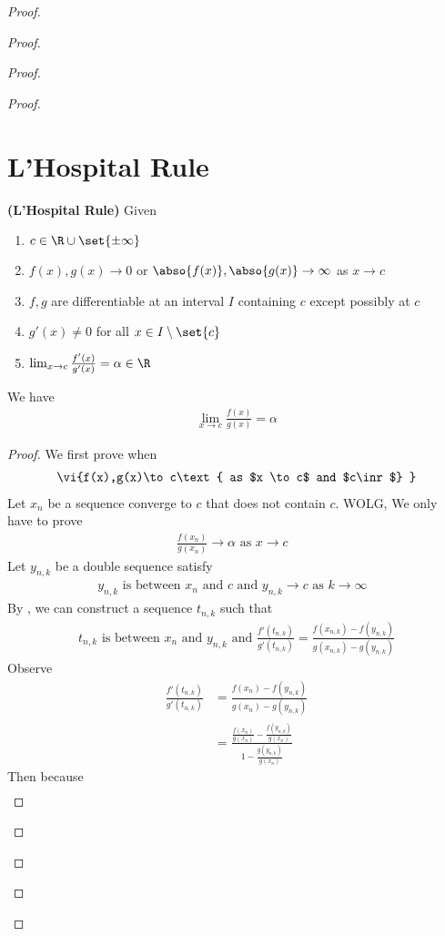\documentclass{report}
\begin{document}
\begin{proof}
\begin{proof}
\begin{proof}
\begin{proof}
\section{L'Hospital Rule}
\begin{theorem}
\label{6.4.1}
\textbf{(L'Hospital Rule)} Given 
\begin{enumerate}[label=(\alph*)]
  \item  $c\in \R\cup  \set{\pm \infty}$ 
  \item $f(x),g(x) \to 0$ or $\abso{f(x)},\abso{g(x)}\to \infty$ as $x \to c$
  \item $f,g$ are differentiable at an interval  $I$ containing  $c$  except possibly at $c$ 
  \item $g'(x)\neq 0$ for all $x\in I \setminus \set{c}$ 
  \item $\lim_{x \to c}\frac{f'(x)}{g'(x)}=\alpha \in\R$
\end{enumerate}
We have 
\begin{align*}
\lim_{x \to c} \frac{f(x)}{g(x)}=\alpha 
\end{align*}
\end{theorem}
\begin{proof}
We first prove when 
 \begin{align*}
 \vi{f(x),g(x)\to c\text{ as $x \to c$ and $c\inr$} }
 \end{align*}
Let $x_n$ be a sequence converge to $c$ that does not contain $c$. WOLG, We only have to prove 
\begin{align*}
\frac{f(x_n)}{g(x_n)}\to \alpha \text{ as $x \to c$ }
\end{align*}
Let $y_{n,k}$ be a double sequence satisfy 
\begin{align*}
y_{n,k} \text{ is between }x_n\text{ and }c\text{ and }y_{n,k}\to c\text{ as $k\to \infty$ }
\end{align*}
By , we can construct a sequence $t_{n,k}$ such that 
 \begin{align*}
t_{n,k} \text{ is between $x_n$ and  $y_{n,k}$ and }\frac{f'(t_{n,k})}{g'(t_{n,k})}=\frac{f(x_{n,k})-f(y_{n,k})}{g(x_{n,k})-g(y_{n,k})}
\end{align*}
Observe 
\begin{align*}
\frac{f'(t_{n,k})}{g'(t_{n,k})}&=\frac{f(x_{n})-f(y_{n,k})}{g(x_n)-g(y_{n,k})}\\
&=\frac{\frac{f(x_n)}{g(x_n)}-\frac{f(y_{n,k})}{g(x_n)}}{1-\frac{g(y_{n,k})}{g(x_n)}}
\end{align*}
Then because 
\begin{align*}

\end{align*}
\end{proof}
\end{proof}
\end{proof}
\end{proof}
\end{proof}
\end{document}
